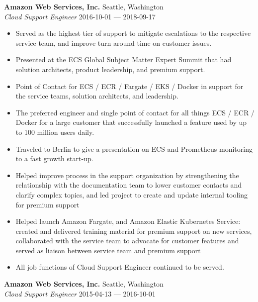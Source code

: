 \documentclass[a4paper]{article}
\newcommand{\RNum}[1]{\uppercase\expandafter{\romannumeral #1\relax}}
\begin{document}
\textbf{Amazon Web Services, Inc.} \hfill{Seattle, Washington} \\
\textit{Cloud Support Engineer \RNum{2}} \hfill{2016-10-01 --- 2018-09-17} \\
\vspace{-1mm}
\begin{itemize} \itemsep 1pt
    \item Served as the highest tier of support to mitigate escalations to the respective service team, and improve turn around time on customer issues.
    \item Presented at the ECS Global Subject Matter Expert Summit that had solution architects, product leadership, and premium support.
    \item Point of Contact for ECS / ECR / Fargate / EKS / Docker in support for the service teams, solution architects, and leadership.
    \item The preferred engineer and single point of contact for all things ECS / ECR / Docker for a large customer that successfully launched a feature used by up to 100 million users daily.
    \item Traveled to Berlin to give a presentation on ECS and Prometheus monitoring to a fast growth start-up.
    \item Helped improve process in the support organization by strengthening the relationship with the documentation team to lower customer contacts and clarify complex topics, and led project to create and update internal tooling for premium support
    \item Helped launch Amazon Fargate, and Amazon Elastic Kubernetes Service: created and delivered training material for premium support on new services, collaborated with the service team to advocate for customer features and served as liaison between service team and premium support
    \item All job functions of Cloud Support Engineer \RNum{1} continued to be served.
\end{itemize}
\textbf{Amazon Web Services, Inc.} \hfill{Seattle, Washington} \\
\textit{Cloud Support Engineer \RNum{1}} \hfill{2015-04-13 --- 2016-10-01} \\
\vspace{-1mm}
\end{document}
